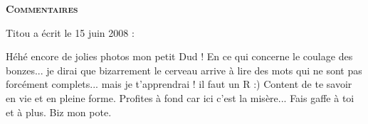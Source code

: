 \bigskip
\textbf{\textsc{Commentaires}}

\medskip
Titou a écrit le 15 juin 2008 :
\begin{displayquote}
Héhé encore de jolies photos mon petit Dud !
En ce qui concerne le coulage des bonzes... je dirai que bizarrement le cerveau arrive à lire des mots qui ne sont pas forcément complets... mais je t'apprendrai ! il faut un R :) Content de te savoir en vie et en pleine forme. Profites à fond car ici c'est la misère...
Fais gaffe à toi et à plus.
Biz mon pote.
\end{displayquote}

\vfill
